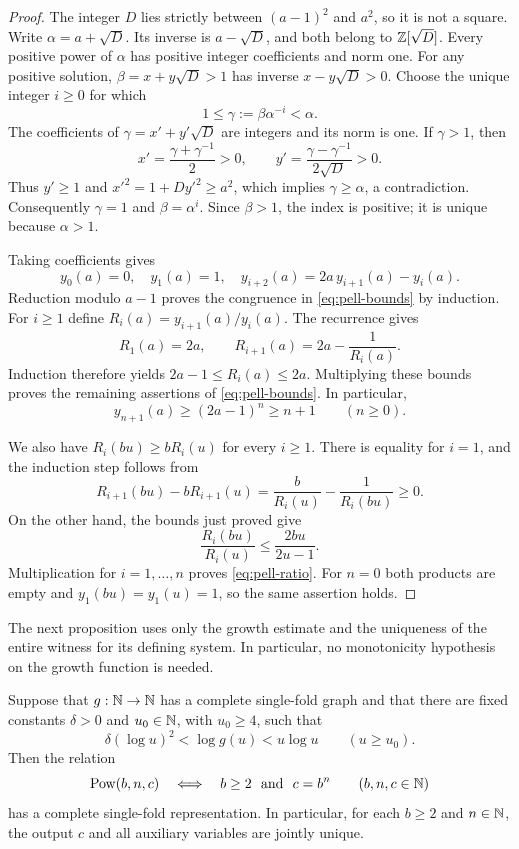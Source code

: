 \begin{proof}
The integer $D$ lies strictly between $(a-1)^2$ and $a^2$, so it is
not a square.  Write $\alpha=a+\sqrt D$.  Its inverse is
$a-\sqrt D$, and both belong to $\mathbb Z[\sqrt D]$.
Every positive power of $\alpha$ has positive integer coefficients
and norm one.
For any positive solution, $\beta=x+y\sqrt D>1$ has inverse
$x-y\sqrt D>0$.  Choose the unique integer $i\ge0$ for which
\[
 1\le\gamma:=\beta\alpha^{-i}<\alpha.
\]
The coefficients of $\gamma=x'+y'\sqrt D$ are integers and its norm is
one.  If $\gamma>1$, then
\[
 x'=\frac{\gamma+\gamma^{-1}}2>0,\qquad
 y'=\frac{\gamma-\gamma^{-1}}{2\sqrt D}>0.
\]
Thus $y'\ge1$ and $x'^2=1+Dy'^2\ge a^2$, which implies
$\gamma\ge\alpha$, a contradiction.  Consequently $\gamma=1$ and
$\beta=\alpha^i$.  Since $\beta>1$, the index is positive; it is unique
because $\alpha>1$.

Taking coefficients gives
\[
 y_0(a)=0,\quad y_1(a)=1,\quad
 y_{i+2}(a)=2a\,y_{i+1}(a)-y_i(a).
\]
Reduction modulo $a-1$ proves the congruence in
\eqref{eq:pell-bounds} by induction.  For $i\ge1$ define
$R_i(a)=y_{i+1}(a)/y_i(a)$.  The recurrence gives
\[
 R_1(a)=2a,\qquad R_{i+1}(a)=2a-\frac1{R_i(a)}.
\]
Induction therefore yields $2a-1\le R_i(a)\le2a$.  Multiplying these
bounds proves the remaining assertions of \eqref{eq:pell-bounds}.
In particular,
\begin{equation}\label{eq:pell-index-lower}
 y_{n+1}(a)\ge(2a-1)^n\ge n+1\qquad(n\ge0).
\end{equation}

We also have $R_i(bu)\ge bR_i(u)$ for every $i\ge1$.
There is equality for $i=1$, and the induction step follows from
\[
 R_{i+1}(bu)-bR_{i+1}(u)
 =\frac b{R_i(u)}-\frac1{R_i(bu)}\ge0.
\]
On the other hand, the bounds just proved give
\[
 \frac{R_i(bu)}{R_i(u)}\le\frac{2bu}{2u-1}.
\]
Multiplication for $i=1,\ldots,n$ proves \eqref{eq:pell-ratio}.
For $n=0$ both products are empty and $y_1(bu)=y_1(u)=1$,
so the same assertion holds.
\end{proof}

The next proposition uses only the growth estimate and the uniqueness
of the entire witness for its defining system.  In particular, no
monotonicity hypothesis on the growth function is needed.

\begin{proposition}\label{prop:power}
Suppose that $g:\mathbb N\to\mathbb N$ has a complete single-fold graph and that
there are fixed constants $\delta>0$ and $u_0\in\mathbb N$, with $u_0\ge4$,
such that
\begin{equation}\label{eq:power-growth-hypothesis}
 \delta(\log u)^2<\log g(u)<u\log u
 \qquad(u\ge u_0).
\end{equation}
Then the relation
\[
 \operatorname{Pow}(b,n,c)\quad\Longleftrightarrow\quad
 b\ge2\ \hbox{ and }\ c=b^n
 \qquad(b,n,c\in\mathbb N)
\]
has a complete single-fold representation.  In particular, for each
$b\ge2$ and $n\in\mathbb N$, the output $c$ and all auxiliary variables
are jointly unique.
\end{proposition}

